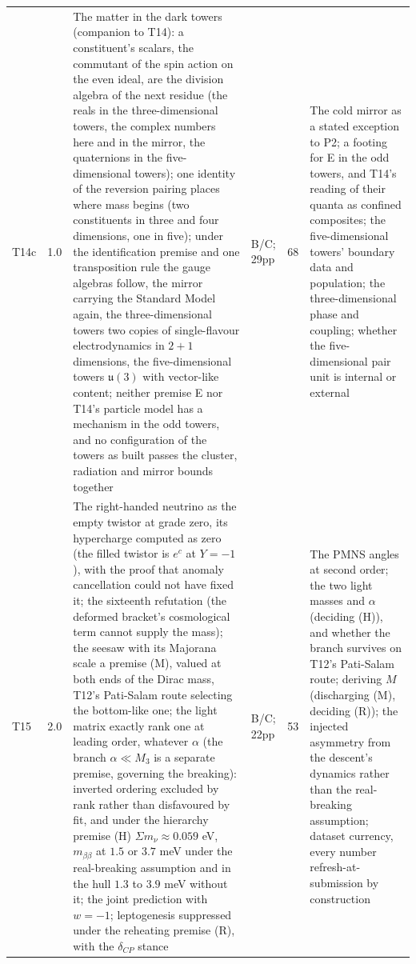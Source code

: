 \documentclass[11pt]{article}
\theoremstyle{definition}
\newcommand{\mnu}{\Sigma m_{\nu}}
\begin{document}
\begin{longtable}{p{} p{} p{} p{} p{} p{}}
T14c & 1.0 & The matter in the dark towers (companion to T14): a constituent's scalars, the commutant of the spin action on the even ideal, are the division algebra of the next residue (the reals in the three-dimensional towers, the complex numbers here and in the mirror, the quaternions in the five-dimensional towers); one identity of the reversion pairing places where mass begins (two constituents in three and four dimensions, one in five); under the identification premise and one transposition rule the gauge algebras follow, the mirror carrying the Standard Model again, the three-dimensional towers two copies of single-flavour electrodynamics in $2+1$ dimensions, the five-dimensional towers $\mathfrak{u}(3)$ with vector-like content; neither premise E nor T14's particle model has a mechanism in the odd towers, and no configuration of the towers as built passes the cluster, radiation and mirror bounds together \cite{ButlerT14c} & B/C; 29pp & 68 & The cold mirror as a stated exception to P2; a footing for E in the odd towers, and T14's reading of their quanta as confined composites; the five-dimensional towers' boundary data and population; the three-dimensional phase and coupling; whether the five-dimensional pair unit is internal or external \\
T15 & 2.0 & The right-handed neutrino as the empty twistor at grade zero, its hypercharge computed as zero (the filled twistor is $e^{c}$ at $Y = -1$), with the proof that anomaly cancellation could not have fixed it; the sixteenth refutation (the deformed bracket's cosmological term cannot supply the mass); the seesaw with its Majorana scale a premise (M), valued at both ends of the Dirac mass, T12's Pati-Salam route selecting the bottom-like one; the light matrix exactly rank one at leading order, whatever $\alpha$ (the branch $\alpha \ll M_{3}$ is a separate premise, governing the breaking): inverted ordering excluded by rank rather than disfavoured by fit, and under the hierarchy premise (H) $\mnu \approx 0.059$ eV, $m_{\beta\beta}$ at $1.5$ or $3.7$ meV under the real-breaking assumption and in the hull $1.3$ to $3.9$ meV without it; the joint prediction with $w = -1$; leptogenesis suppressed under the reheating premise (R), with the $\delta_{CP}$ stance \cite{ButlerT15} & B/C; 22pp & 53 & The PMNS angles at second order; the two light masses and $\alpha$ (deciding (H)), and whether the branch survives on T12's Pati-Salam route; deriving $M$ (discharging (M), deciding (R)); the injected asymmetry from the descent's dynamics rather than the real-breaking assumption; dataset currency, every number refresh-at-submission by construction \\

\end{longtable}
\end{document}
